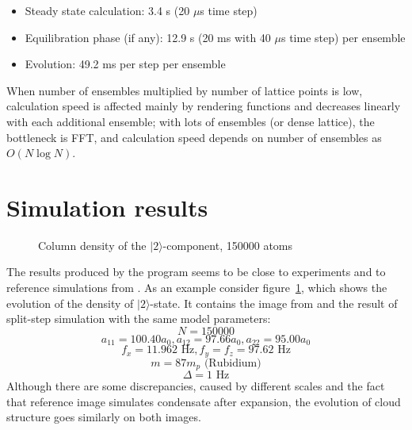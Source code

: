 \documentclass[12pt,notitlepage]{report}
\begin{document}
\begin{itemize}
\item Steady state calculation: 3.4 s (20 $\mu$s time step)
\item Equilibration phase (if any): 12.9 s (20 ms with 40 $\mu$s time step) per ensemble
\item Evolution: 49.2 ms per step per ensemble
\end{itemize}

When number of ensembles multiplied by number of lattice points is low, calculation speed is affected mainly by rendering functions and decreases linearly with each additional ensemble; with lots of ensembles (or dense lattice), the bottleneck is FFT, and calculation speed depends on number of ensembles as $O(N\log{N})$.

\section*{Simulation results}

\begin{figure}
\begin{center}
\qquad
{}
\end{center}
\caption{Column density of the $\vert2\rangle$-component, 150000 atoms}
\label{evolution_vs_reference}
\end{figure}

The results produced by the program seems to be close to experiments and to reference simulations from \cite{anderson-2009-80}. As an example consider figure~\ref{evolution_vs_reference}, which shows the evolution of the density of $\vert2\rangle$-state. It contains the image from \cite{anderson-2009-80} and the result of split-step simulation with the same model parameters:
\[ N = 150000 \]
\[ a_{11} = 100.40 a_0, a_{12} = 97.66 a_0, a_{22} = 95.00 a_0 \]
\[ f_x = 11.962 \textrm{ Hz}, f_y = f_z = 97.62 \textrm{ Hz} \]
\[ m = 87 m_p \textrm{ (Rubidium)}\]
\[ \Delta = 1 \textrm{ Hz} \]
Although there are some discrepancies, caused by different scales and the fact that reference image simulates condensate after expansion, the evolution of cloud structure goes similarly on both images.
\end{document}
